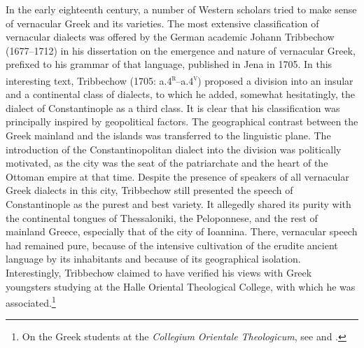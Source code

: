 \documentclass[output=paper]{langsci/langscibook}
\begin{document}
In the early eighteenth century, a number of Western scholars tried to make sense of vernacular Greek and its varieties. The most extensive classification of vernacular dialects was offered by the German academic Johann Tribbechow (1677–1712) in his dissertation on the emergence and nature of vernacular Greek, prefixed to his grammar of that language, published in Jena in 1705. In this interesting text, Tribbechow (1705: a.4\textsc{\textsuperscript{r}}\textsc{–}a.4\textsc{\textsuperscript{v}}) proposed a division into an insular and a continental class of dialects, to which he added, somewhat hesitatingly, the dialect of Constantinople as a third class. It is clear that his classification was principally inspired by geopolitical factors. The geographical contrast between the Greek mainland and the islands was transferred to the linguistic plane. The introduction of the Constantinopolitan dialect into the division was politically motivated, as the city was the seat of the patriarchate and the heart of the Ottoman empire at that time. Despite the presence of speakers of all vernacular Greek dialects in this city, Tribbechow still presented the speech of Constantinople as the purest and best variety. It allegedly shared its purity with the continental tongues of Thessaloniki, the Peloponnese, and the rest of mainland Greece, especially that of the city of Ioannina. There, vernacular speech had remained pure, because of the intensive cultivation of the erudite ancient language by its inhabitants and because of its geographical isolation. Interestingly, Tribbechow claimed to have verified his views with Greek youngsters studying at the Halle Oriental Theological College, with which he was associated.\footnote{On the Greek students at the \textit{Collegium} \textit{Orientale} \textit{Theologicum}, see \citet{Moennig1998} and \citet[283]{Makrides2006}.}
\end{document}
